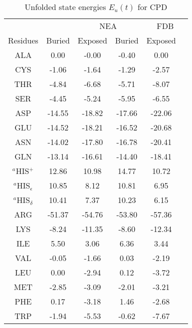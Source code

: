 \documentclass[a4paper,12pt]{article}
\begin{document}
\begin{table}[h]
\caption{Unfolded state energies $E_u(t)$ for CPD}
\label{tab:Eref}                      
\begin{center}
\small
\begin{tabular}{cccccc} \hline \hline
         &   & \multicolumn{2}{c}{\hrulefill NEA \hrulefill} & \multicolumn{2}{c}{\hrulefill FDB \hrulefill}\\
Residues               & Buried  & Exposed  &  Buried   & Exposed  \\ \hline
ALA                    &   0.00  &   -0.00  &   -0.40   &    0.00  \\	            
CYS                    &  -1.06  &   -1.64  &   -1.29   &   -2.57  \\	
THR                    &  -4.84  &   -6.68  &   -5.71   &   -8.07  \\	
SER                    &  -4.45  &   -5.24  &   -5.95   &   -6.55  \\	
ASP                    & -14.55  &  -18.82  &  -17.66   &  -22.06  \\	
GLU                    & -14.52  &  -18.21  &  -16.52   &  -20.68  \\	
ASN                    & -14.02  &  -17.80  &  -16.78   &  -20.41  \\	
GLN                    & -13.14  &  -16.61  &  -14.40   &  -18.41  \\	
$^a$HIS$^+$            &  12.86  &   10.98  &   14.77   &   10.72  \\	
$^a$HIS$_{\epsilon}$     &  10.85  &    8.12  &   10.81   &    6.95  \\	
$^a$HIS$_{\delta}$       &  10.41  &    7.37  &   10.23   &    6.15  \\	
ARG                    & -51.37  &  -54.76  &  -53.80   &  -57.36  \\	
LYS                    &  -8.24  &  -11.35  &   -8.60   &  -12.34  \\	
ILE                    &   5.50  &    3.06  &    6.36   &    3.44  \\	
VAL                    &  -0.05  &   -1.66  &    0.03   &   -2.19  \\	
LEU                    &   0.00  &   -2.94  &    0.12   &   -3.72  \\	
MET                    &  -2.85  &   -3.09  &   -2.01   &   -3.21  \\	
PHE                    &   0.17  &   -3.18  &    1.46   &   -2.68  \\	
TRP                    &  -1.94  &   -5.53  &   -0.62   &   -7.67  \\	

\end{tabular}
\end{center}
\end{table}
\end{document}

